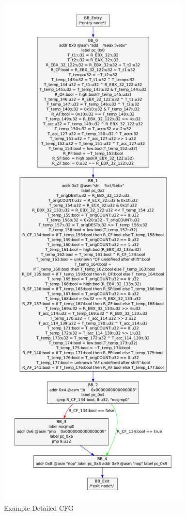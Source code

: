\begin{figure}[!p]
  \begin{center}
    \includegraphics[height=.9\textheight]{chap-examples/ssacfg.pdf}
  \end{center}
  \caption{Example Detailed CFG}
  \label{fig:cfg}
\end{figure}

